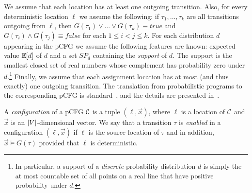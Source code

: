\begin{definition}
We assume that each location has at least one outgoing transition.
Also, for every deterministic location $\ell$ we assume the following: if
$\tau_1,\dots,\tau_k$ are all transitions outgoing from $\ell$, then $G(\tau_1)
\vee \dots \vee G(\tau_k) \equiv \mathit{true}$ and $G(\tau_i) \wedge G(\tau_j)
\equiv \mathit{false}$ for each $1\leq i < j \leq k$. For each 
distribution $d$ appearing in the 
pCFG we assume the following features are known: expected value $\mathbb{E}[d]$ of 
$d$ and a set $SP_d$ containing the \emph{support} of $d$. The support is the  
smallest 
closed set of real numbers whose complement has probability zero 
under $d$.\footnote{In particular, a support of a \emph{discrete} probability 
	distribution $d$ is simply the at most countable set of all points on a 
	real 
	line that have positive probability under $d$.} Finally, we assume that 
	each 
assignment location has at most (and thus exactly) one outgoing transition. The 
translation from probabilistic programs to the corresponding pCFG is 
standard~\cite{CFNH16:prob-termination}, and the details are presented 
in~\AppendixMaterial.
\end{definition}



\smallskip{}
A \emph{configuration} of a pCFG $\mathcal{C}$ is a tuple $(\ell,\vec{x})$,
where $\ell$ is a location of $\mathcal{C}$ and $\vec{x}$ is an 
$|V|$-dimensional vector.
We say that a transition $\tau$ is \emph{enabled} in a configuration
$(\ell,\vec{x})$ if $\ell$ is the source location of $\tau$ and in addition,
${\vec{x}}\models G(\tau)$ provided that $\ell$ is deterministic. 

